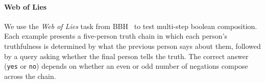 \documentclass{article}
\begin{document}




\paragraph{Web of Lies}
We use the \emph{Web of Lies} task from BBH~\citep{srivastava2023beyond} to test multi-step boolean composition. Each example presents a five-person truth chain in which each person's truthfulness is determined by what the previous person says about them, followed by a query asking whether the final person tells the truth. The correct answer (\texttt{yes} or \texttt{no}) depends on whether an even or odd number of negations compose across the chain.
\end{document}
